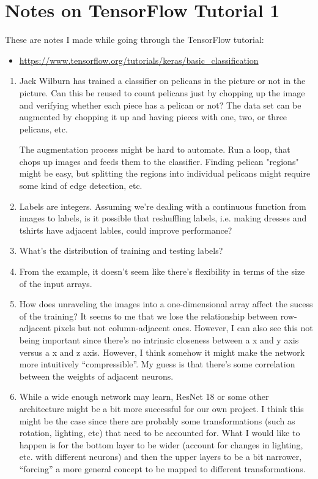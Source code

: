 \chapter{Notes on TensorFlow Tutorial 1}
These are notes I made while going through the TensorFlow tutorial:
\begin{itemize} 
	\item
	\url{https://www.tensorflow.org/tutorials/keras/basic_classification}
\end{itemize}
\begin{enumerate} 
	\item  Jack Wilburn has trained a classifier on pelicans in the picture
	or not in the picture. Can this be reused to count pelicans just by
	chopping up the image and verifying whether each piece has a pelican or
	not? The data set can be augmented by chopping it up and having pieces
	with one, two, or three pelicans, etc.

	The augmentation process might be hard to automate. Run a loop, that chops up
	images and feeds them to the classifier. Finding pelican "regions"
	might be easy, but splitting the regions into individual pelicans might
	require some kind of edge detection, etc.

	\item  Labels are integers. Assuming we're dealing with a continuous
	function from images to labels, is it possible that reshuffling labels,
	i.e. making dresses and tshirts have adjacent lables, could improve
	performance?

	\item What's the distribution of training and testing labels?

	\item From the example, it doesn't seem like there's flexibility in
	terms of the size of the input arrays.

	\item How does unraveling the images into a one-dimensional array
	affect the sucess of the training? It seems to me that we lose the
	relationship between row-adjacent pixels but not column-adjacent
	ones. However, I can also see this not being important since there's
	no intrinsic closeness between a x and y axis versus a x and z axis.
	However, I think somehow it might make the network more intuitively
	``compressible''. My guess is that there's some correlation between the
	weights of adjacent neurons.

	\item While a wide enough network may learn, ResNet 18 or some other
	architecture might be a bit more successful for our own project. I
	think this might be the case since there are probably some
	transformations (such as rotation, lighting, etc) that need to be
	accounted for. What I would like to happen is for the bottom layer to
	be wider (account for changes in lighting, etc. with different neurons)
	and then the upper layers to be a bit narrower, ``forcing'' a more
	general concept to be mapped to different transformations.


\end{enumerate}
